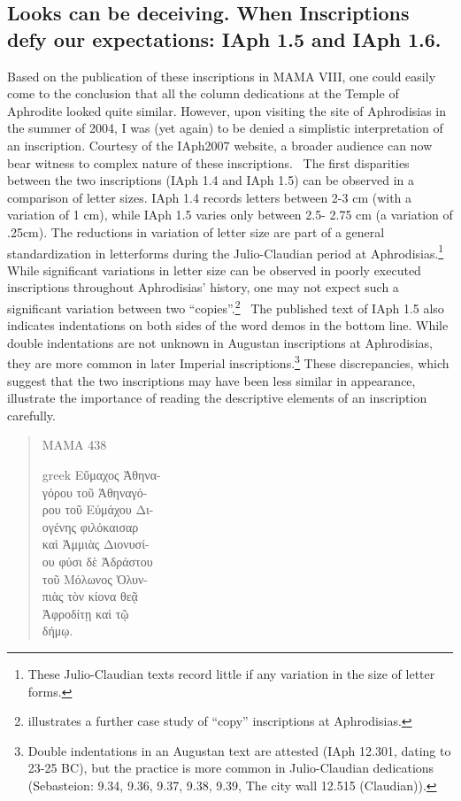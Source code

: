 \documentclass[amsthm,ebook]{saparticle}
\begin{document}
\subsection{Looks can be deceiving. When Inscriptions defy our expectations: IAph 1.5 and IAph 1.6.}
\noindent Based on the publication of these inscriptions in MAMA VIII, one could easily come to the conclusion that all the column
dedications at the Temple of Aphrodite looked quite similar. However, upon visiting the site of Aphrodisias in the
summer of 2004, I was (yet again) to be denied a simplistic interpretation of an inscription. Courtesy of the IAph2007
website, a broader audience can now bear witness to complex nature of these inscriptions. \ The first disparities
between the two inscriptions (IAph 1.4 and IAph 1.5) can be observed in a comparison of letter sizes. IAph 1.4 records
letters between 2-3 cm (with a variation of 1 cm), while IAph 1.5 varies only between 2.5- 2.75 cm (a variation of
.25cm). The reductions in variation of letter size are part of a general standardization in letterforms during the
Julio-Claudian period at Aphrodisias.\footnote{ These Julio-Claudian texts record little if any variation in the size
of letter forms. } While significant variations in letter size can be observed in poorly executed inscriptions
throughout Aphrodisias’ history, one may not expect such a significant variation between two ``copies''.\footnote{
\citep{graham2015} illustrates a further case study of ``copy'' inscriptions at Aphrodisias.} \ The published
text of IAph 1.5 also indicates indentations on both sides of the word demos in the bottom line. While double
indentations are not unknown in Augustan inscriptions at Aphrodisias, they are more common in later Imperial
inscriptions.\footnote{ Double indentations in an Augustan text are attested (IAph 12.301, dating to 23-25 BC), but the
practice is more common in Julio-Claudian dedications (Sebasteion: 9.34, 9.36, 9.37, 9.38, 9.39, The city wall 12.515
(Claudian)).} These discrepancies, which suggest that the two inscriptions may have been less similar in appearance,
illustrate the importance of reading the descriptive elements of an inscription carefully. 


\begin{quotation}
\noindent MAMA 438\\
\begin{otherlanguage*}{greek}
\noindent Εὔμαχος Ἀθηνα-\\
γόρου τοῦ Ἀθηναγό-\\
ρου τοῦ Εὐμάχου Δι-\\
ογένης φιλόκαισαρ\\
καὶ Ἀμμιὰς Διονυσί-\\
ου φύσι δὲ Ἀδράστου\\
τοῦ Μόλωνος Ὀλυν-\\
πιὰς τὸν κίονα θεᾷ\\
Ἀφροδίτῃ καὶ τῷ\\
δήμῳ.
\end{otherlanguage*}
\end{quotation}
\end{document}
